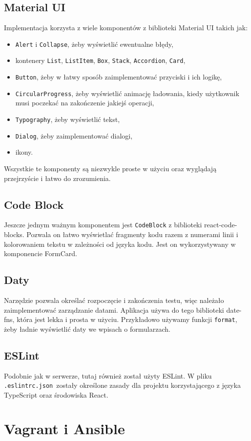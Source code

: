 \subsection{Material UI}
Implementacja korzysta z wiele komponentów z biblioteki Material UI takich jak:
\begin{itemize}
  \item \texttt{Alert} i \texttt{Collapse}, żeby wyświetlić ewentualne błędy,
  \item kontenery \texttt{List}, \texttt{ListItem}, \texttt{Box}, \texttt{Stack},
    \texttt{Accordion}, \texttt{Card},
  \item \texttt{Button}, żeby w łatwy sposób zaimplementować przyciski
    i ich logikę,
  \item \texttt{CircularProgress}, żeby wyświetlić animację ładowania, kiedy
    użytkownik musi poczekać na zakończenie jakiejś operacji,
  \item \texttt{Typography}, żeby wyświetlić tekst,
  \item \texttt{Dialog}, żeby zaimplementować dialogi,
  \item ikony.
\end{itemize}
Wszystkie te komponenty są niezwykle proste w użyciu oraz wyglądają przejrzyście
i łatwo do zrozumienia.
\subsection{Code Block}
Jeszcze jednym ważnym komponentem jest \texttt{CodeBlock} z biblioteki react-code-blocks.
Pozwala on łatwo wyświetlać fragmenty kodu razem z numerami linii i kolorowaniem
tekstu w zależności od języka kodu. Jest on wykorzystywany w komponencie FormCard.
\subsection{Daty}
Narzędzie pozwala określać rozpoczęcie i zakończenia testu, więc należało
zaimplementować zarządzanie datami. Aplikacja używa do tego biblioteki date-fns,
która jest lekka i prosta w użyciu. Przykładowo używamy funkcji \texttt{format}, żeby
ładnie wyświetlić daty we wpisach o formularzach.

\subsection{ESLint}
Podobnie jak w serwerze, tutaj również został użyty ESLint. W pliku
\texttt{.eslintrc.json}~zostały określone zasady dla projektu korzystającego
z języka TypeScript oraz środowiska React.

\section{Vagrant i Ansible}
 